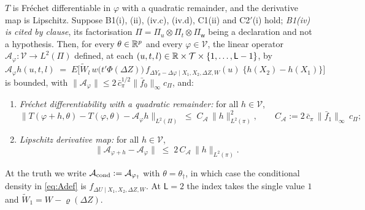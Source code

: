 \begin{proposition}\label{prp:frechet}
$T$ is Fr\'echet differentiable in $\varphi$ with a quadratic remainder, and the derivative map is
Lipschitz.
Suppose B1(i), (ii), (iv.c), (iv.d), C1(ii) and C2$'$(i) hold; \emph{B1(iv) is cited by clause}, its
factorisation $\Pi=\Pi_u\otimes\Pi_t\otimes\Pi_{\mathsf w}$ being a declaration and not a hypothesis.
Then, for every $\theta\in\mathbb{R}^{p}$ and every
$\varphi\in\mathcal V$, the linear operator $\mathcal A_\varphi:\mathcal V\to L^{2}(\Pi)$ defined, at
each $(u,t,l)\in\mathbb{R}\times\mathcal T\times\{1,\dots,\mathsf L-1\}$, by
\begin{equation}\label{eq:Adef}
\mathcal A_\varphi h(u,t,l)
\;=\;E\Big[\widetilde W_l\,w\big(t'\Phi(\Delta Z)\big)\,
f_{\Delta Y_\theta-\Delta\varphi\mid X_1,X_2,\Delta Z,W}(u)\;\big\{h(X_2)-h(X_1)\big\}\Big]
\end{equation}
is bounded, with $\|\mathcal A_\varphi\|\le2\,\bar c_\pi^{1/2}\|\bar f_0\|_\infty c_\Pi$, and:
\begin{enumerate}
\item[(i)] \emph{Fr\'echet differentiability with a quadratic remainder:} for all $h\in\mathcal V$,
\begin{equation}\label{eq:frechetbound}
\big\|T(\varphi+h,\theta)-T(\varphi,\theta)-\mathcal A_\varphi h\big\|_{L^{2}(\Pi)}
\;\le\;C_{\!\mathcal A}\,\|h\|_{L^{2}(\pi)}^{2},
\qquad C_{\!\mathcal A}:=2\,\bar c_\pi\,\|\bar f_1\|_\infty\,c_\Pi ;
\end{equation}
\item[(ii)] \emph{Lipschitz derivative map:} for all $h\in\mathcal V$,
\begin{equation}\label{eq:lipschitz}
\big\|\mathcal A_{\varphi+h}-\mathcal A_\varphi\big\|\;\le\;2\,C_{\!\mathcal A}\,\|h\|_{L^{2}(\pi)} .
\end{equation}
\end{enumerate}
At the truth we write $\mathcal A_{\mathrm{cond}}:=\mathcal A_{\varphi_{\dagger}}$ with $\theta=\theta_\dagger$,
in which case the conditional density in \eqref{eq:Adef} is $f_{\Delta U\mid X_1,X_2,\Delta Z,W}$.
At $\mathsf L=2$ the index takes the single value $1$ and $\widetilde W_1=W-\varrho(\Delta Z)$.
\end{proposition}

